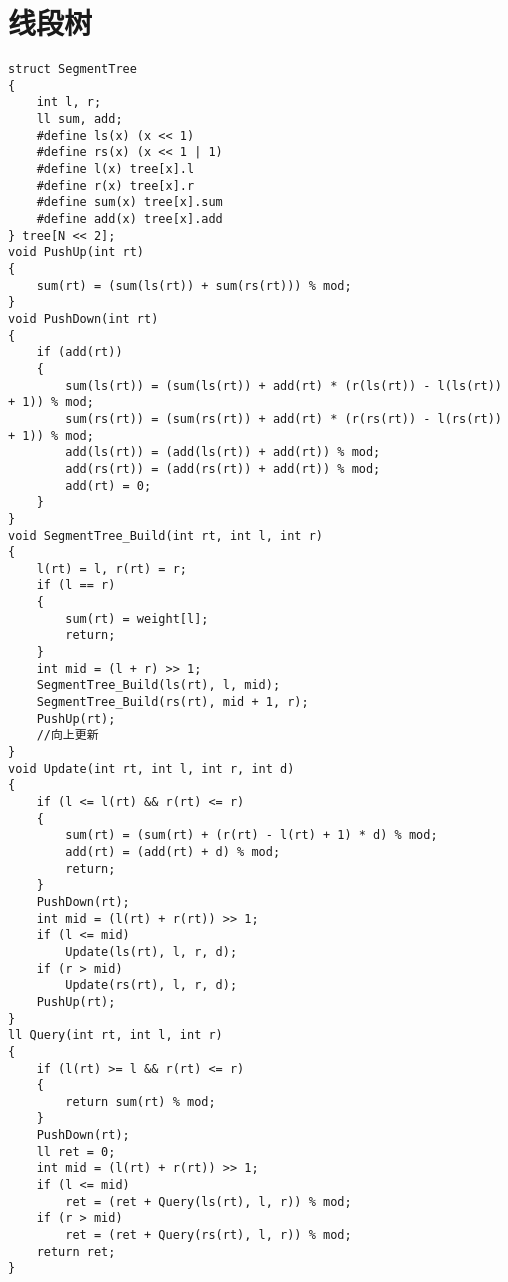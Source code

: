 \section{线段树}
\begin{lstlisting}
struct SegmentTree
{
    int l, r;
    ll sum, add;
    #define ls(x) (x << 1)
    #define rs(x) (x << 1 | 1)
    #define l(x) tree[x].l
    #define r(x) tree[x].r
    #define sum(x) tree[x].sum
    #define add(x) tree[x].add
} tree[N << 2];
void PushUp(int rt)
{
    sum(rt) = (sum(ls(rt)) + sum(rs(rt))) % mod;
}
void PushDown(int rt)
{
    if (add(rt))
    {
        sum(ls(rt)) = (sum(ls(rt)) + add(rt) * (r(ls(rt)) - l(ls(rt)) + 1)) % mod;
        sum(rs(rt)) = (sum(rs(rt)) + add(rt) * (r(rs(rt)) - l(rs(rt)) + 1)) % mod;
        add(ls(rt)) = (add(ls(rt)) + add(rt)) % mod;
        add(rs(rt)) = (add(rs(rt)) + add(rt)) % mod;
        add(rt) = 0;
    }
}
void SegmentTree_Build(int rt, int l, int r)
{
    l(rt) = l, r(rt) = r;
    if (l == r)
    {
        sum(rt) = weight[l];
        return;
    }
    int mid = (l + r) >> 1;
    SegmentTree_Build(ls(rt), l, mid);
    SegmentTree_Build(rs(rt), mid + 1, r);
    PushUp(rt);
    //向上更新
}
void Update(int rt, int l, int r, int d)
{
    if (l <= l(rt) && r(rt) <= r)
    {
        sum(rt) = (sum(rt) + (r(rt) - l(rt) + 1) * d) % mod;
        add(rt) = (add(rt) + d) % mod;
        return;
    }
    PushDown(rt);
    int mid = (l(rt) + r(rt)) >> 1;
    if (l <= mid)
        Update(ls(rt), l, r, d);
    if (r > mid)
        Update(rs(rt), l, r, d);
    PushUp(rt);
}
ll Query(int rt, int l, int r)
{
    if (l(rt) >= l && r(rt) <= r)
    {
        return sum(rt) % mod;
    }
    PushDown(rt);
    ll ret = 0;
    int mid = (l(rt) + r(rt)) >> 1;
    if (l <= mid)
        ret = (ret + Query(ls(rt), l, r)) % mod;
    if (r > mid)
        ret = (ret + Query(rs(rt), l, r)) % mod;
    return ret;
}    
\end{lstlisting}
